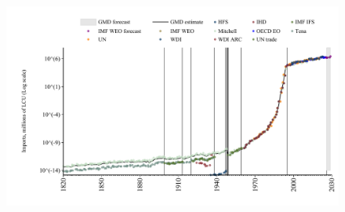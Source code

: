 \documentclass[12pt,a4paper,landscape]{article}
\begin{document}
\begin{adjustbox}{max totalsize={\paperwidth}{\paperheight},center}
\begin{minipage}[t][\textheight][t]{\textwidth}
\begin{figure}[H]
\includegraphics[width=\textwidth,height=0.6\textheight,keepaspectratio]{graphs/BRA_imports.pdf}
\end{figure}
\end{minipage}
\end{adjustbox}
\end{document}
